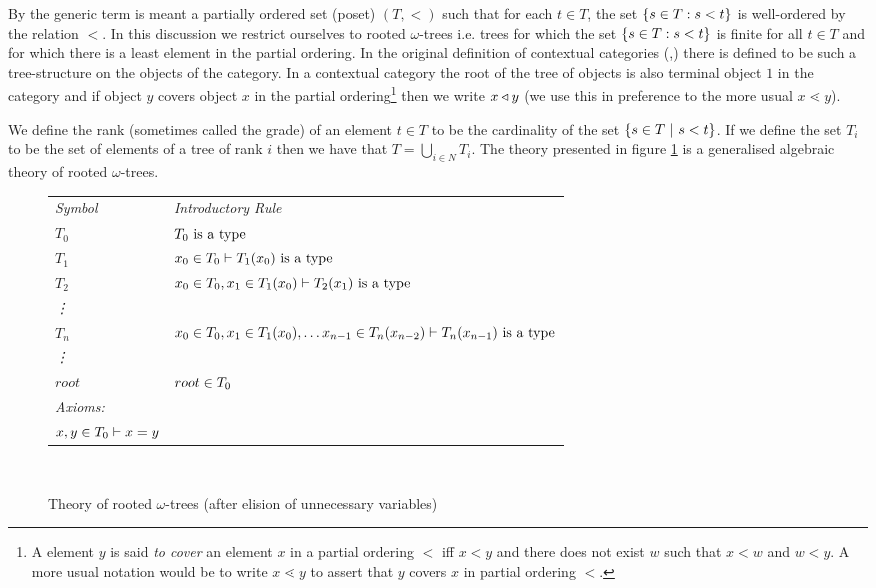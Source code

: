 \note 
By  the generic term  is meant a partially ordered set (poset) $(T, <)$ such that for each $t \in T$, the set $\left\{s \in T : s < t\right\}$ is well-ordered by the relation $<$.
In this discussion we restrict ourselves to rooted $\omega$-trees i.e. trees for which the set $\left\{s \in T : s < t\right\}$
is finite for all $t \in T$ and for which there is a least element in the partial ordering. 
In the original definition
of contextual categories (\cite{Cartmell78,Cartmell86},) there is defined to be such a tree-structure on the objects of the category. In a contextual category the root of the tree of objects is also  terminal object $1$
in the category and if object $y$ covers object $x$ in the partial ordering\footnote{A element $y$ is said \textit{to cover} 
an element $x$ in a partial ordering $<$ iff $x<y$ and there does not exist $w$ such that $x < w$ and $w < y$.
A more usual notation would be to write $x \lessdot y$ to assert that $y$ covers $x$ in partial ordering $<$. }
then we write $x \triangleleft y$ (we use this in preference to the more usual $x \lessdot y$). 

We define the rank (sometimes called the grade) of an element $t \in T$ to be the cardinality
of the set $\left\{s \in T \ \middle|\ s < t\right\}$. If we define the set $T_i$ to be the set of elements of a tree
of rank $i$ then we have that $T= \bigcup_{i \in N}T_i$. 
The theory presented in figure \ref{theoryoftrees} is a generalised algebraic theory of rooted $\omega$-trees.\\
\newcommand{\Sz}{T_0}
\newcommand{\ofS}[1]{\ofT{#1}{\Sz}}
\newcommand{\Si}[1]{T_{#1}}
\newcommand{\ofSi}[3]{\ofT{#1}{\Si{#2}(#3)}}
\begin{figure}[H]
\caption{Theory of rooted $\omega$-trees (after elision of unnecessary variables)}
\label{theoryoftrees}
\begin{tabular}{>{\itshape}l l}
Symbol & \itshape{Introductory Rule} \\
$\Sz  $&$\isT{\Sz}$\\
$\Si{1} $&$\ofS{x_0} \tstyle \isT{\Si{1}(x_0)} $\\
$\Si{2} $&$\ofS{x_0},\ofSi{x_1}{1}{x_0} \tstyle \isT{\Si{2}(x_1)} $\\
\vdots  \\
$\Si{n} $&$\ofS{x_0},\ofSi{x_1}{1}{x_0}, \hdots \ofSi{x_{n-1}}{n}{ x_{n-2}} \tstyle \isT{\Si{n}(x_{n-1})} $\\
\vdots   \\
$root$ & $\ofT{root}{\Sz}$ \\
\itshape{Axioms}:  \\
$\ofT{x,y}{\Sz} \tstyle x = y$
\end{tabular} \\
\end{figure}
\newcommand{\bbin}[1]{
\raisebox{-0.5em}{$\stackrel{\displaystyle{\in}} {\scriptstyle{#1}}$}
}
\newcommand{\ofTn}[3]{
#1 \bbin{#2} #3}


